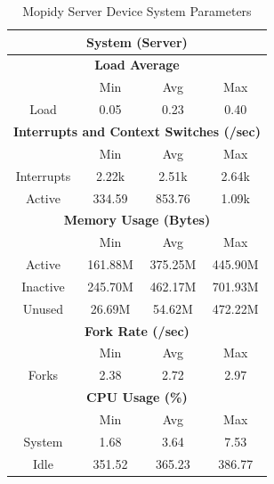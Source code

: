 \documentclass[11pt,a4paper,headinclude=false,footinclude=false]{scrreprt}
\begin{document}
\begin{table}[H]
\centering
    \begin{tabular}{||c|c|c|c|c|c|c||}
    \hline
    \multicolumn{7}{|c|}{\textbf{System (Server)}} \\
    \hline
    \multicolumn{7}{|c|}{\textbf{Load Average}} \\
    \hline\hline
      & \multicolumn{2}{|c|}{Min} & \multicolumn{2}{|c|}{Avg} & \multicolumn{2}{|c|}{Max} \\
    \hline
    Load & \multicolumn{2}{|c|}{0.05} & \multicolumn{2}{|c|}{0.23} & \multicolumn{2}{|c|}{0.40} \\
    \hline\hline
    \multicolumn{7}{|c|}{\textbf{Interrupts and Context Switches (/sec)}} \\
    \hline
      & \multicolumn{2}{|c|}{Min} & \multicolumn{2}{|c|}{Avg} & \multicolumn{2}{|c|}{Max} \\
    \hline
    Interrupts & \multicolumn{2}{|c|}{2.22k} & \multicolumn{2}{|c|}{2.51k} & \multicolumn{2}{|c|}{2.64k} \\
    \hline
    Active & \multicolumn{2}{|c|}{334.59} & \multicolumn{2}{|c|}{853.76} & \multicolumn{2}{|c|}{1.09k} \\
    \hline\hline
    \multicolumn{7}{|c|}{\textbf{Memory Usage (Bytes)}} \\
    \hline\hline
      & \multicolumn{2}{|c|}{Min} & \multicolumn{2}{|c|}{Avg} & \multicolumn{2}{|c|}{Max} \\
    \hline
    Active & \multicolumn{2}{|c|}{161.88M} & \multicolumn{2}{|c|}{375.25M} & \multicolumn{2}{|c|}{445.90M} \\
    \hline
    Inactive & \multicolumn{2}{|c|}{245.70M} & \multicolumn{2}{|c|}{462.17M} & \multicolumn{2}{|c|}{701.93M} \\
    \hline
    Unused & \multicolumn{2}{|c|}{26.69M} & \multicolumn{2}{|c|}{54.62M} & \multicolumn{2}{|c|}{472.22M} \\
    \hline\hline
    \multicolumn{7}{|c|}{\textbf{Fork Rate (/sec)}} \\
    \hline\hline
      & \multicolumn{2}{|c|}{Min} & \multicolumn{2}{|c|}{Avg} & \multicolumn{2}{|c|}{Max} \\
    \hline
    Forks & \multicolumn{2}{|c|}{2.38} & \multicolumn{2}{|c|}{2.72} & \multicolumn{2}{|c|}{2.97} \\
    \hline\hline
    \multicolumn{7}{|c|}{\textbf{CPU Usage (\%)}} \\
    \hline\hline
      & \multicolumn{2}{|c|}{Min} & \multicolumn{2}{|c|}{Avg} & \multicolumn{2}{|c|}{Max} \\
    \hline
    System & \multicolumn{2}{|c|}{1.68} & \multicolumn{2}{|c|}{3.64} & \multicolumn{2}{|c|}{7.53} \\
    \hline
    Idle & \multicolumn{2}{|c|}{351.52} & \multicolumn{2}{|c|}{365.23} & \multicolumn{2}{|c|}{386.77} \\
    \hline\hline
    \end{tabular}
    \caption{Mopidy Server Device System Parameters}
    \label{MopidyserverSysTab}
\end{table}
\end{document}
